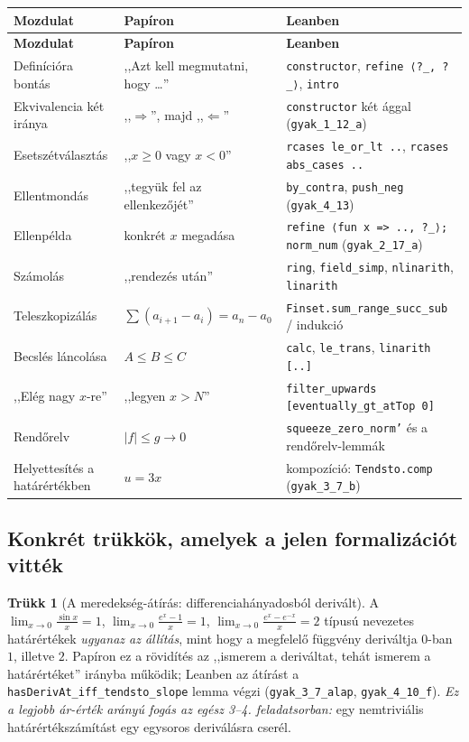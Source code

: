 \documentclass[11pt,a4paper]{article}
\newcommand{\lean}[1]{\texttt{\small #1}}
\theoremstyle{definition}
\newtheorem{trukk}{Trükk}
\begin{document}
\begingroup
\small
\begin{longtable}{@{}>{\raggedright\arraybackslash}p{3.2cm}>{\raggedright\arraybackslash}p{5.2cm}>{\raggedright\arraybackslash}p{6.4cm}@{}}
\toprule
\textbf{Mozdulat} & \textbf{Papíron} & \textbf{Leanben} \\
\midrule
\endfirsthead
\toprule
\textbf{Mozdulat} & \textbf{Papíron} & \textbf{Leanben} \\
\midrule
\endhead
\bottomrule
\endfoot
Definícióra bontás &
,,Azt kell megmutatni, hogy \dots'' &
\lean{constructor}, \lean{refine ⟨?\_, ?\_⟩}, \lean{intro} \\
Ekvivalencia két iránya &
,,$\Rightarrow$'', majd ,,$\Leftarrow$'' &
\lean{constructor} két ággal (\lean{gyak\_1\_12\_a}) \\
Esetszétválasztás &
,,$x \ge 0$ vagy $x < 0$'' &
\lean{rcases le\_or\_lt ..}, \lean{rcases abs\_cases ..} \\
Ellentmondás &
,,tegyük fel az ellenkezőjét'' &
\lean{by\_contra}, \lean{push\_neg} (\lean{gyak\_4\_13}) \\
Ellenpélda &
konkrét $x$ megadása &
\lean{refine ⟨fun x => .., ?\_⟩; norm\_num} (\lean{gyak\_2\_17\_a}) \\
Számolás &
,,rendezés után'' &
\lean{ring}, \lean{field\_simp}, \lean{nlinarith}, \lean{linarith} \\
Teleszkopizálás &
$\sum (a_{i+1}-a_i) = a_n - a_0$ &
\lean{Finset.sum\_range\_succ\_sub} / indukció \\
Becslés láncolása &
$A \le B \le C$ &
\lean{calc}, \lean{le\_trans}, \lean{linarith [..]} \\
,,Elég nagy $x$-re'' &
,,legyen $x > N$'' &
\lean{filter\_upwards [eventually\_gt\_atTop 0]} \\
Rendőrelv &
$|f| \le g \to 0$ &
\lean{squeeze\_zero\_norm'} és a rendőrelv-lemmák \\
Helyettesítés a határértékben &
$u = 3x$ &
kompozíció: \lean{Tendsto.comp} (\lean{gyak\_3\_7\_b}) \\
\end{longtable}
\endgroup

\subsection{Konkrét trükkök, amelyek a jelen formalizációt vitték}

\begin{trukk}[A meredekség-átírás: differenciahányadosból derivált]
A $\lim_{x\to0}\frac{\sin x}{x} = 1$, $\lim_{x\to 0}\frac{e^x-1}{x} = 1$,
$\lim_{x\to0}\frac{e^x-e^{-x}}{x} = 2$ típusú nevezetes határértékek
\emph{ugyanaz az állítás}, mint hogy a megfelelő függvény deriváltja $0$-ban
$1$, illetve $2$. Papíron ez a rövidítés az ,,ismerem a deriváltat, tehát
ismerem a határértéket'' irányba működik; Leanben az átírást a
\lean{hasDerivAt\_iff\_tendsto\_slope} lemma végzi
(\lean{gyak\_3\_7\_alap}, \lean{gyak\_4\_10\_f}).
\emph{Ez a legjobb ár-érték arányú fogás az egész 3--4. feladatsorban:}
egy nemtriviális határértékszámítást egy egysoros deriválásra cserél.
\end{trukk}
\end{document}
